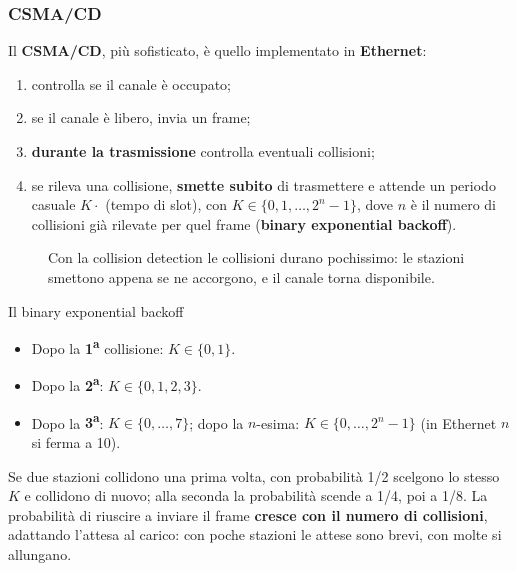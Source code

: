 \subsubsection*{CSMA/CD}

Il \textbf{CSMA/CD}, più sofisticato, è quello implementato in \textbf{Ethernet}:

\begin{enumerate}
    \item controlla se il canale è occupato;
    \item se il canale è libero, invia un frame;
    \item \textbf{durante la trasmissione} controlla eventuali collisioni;
    \item se rileva una collisione, \textbf{smette subito} di trasmettere e attende un periodo casuale $K \cdot$ (tempo di slot), con
          $K \in \{0, 1, \dots, 2^n - 1\}$, dove $n$ è il numero di collisioni già rilevate per quel frame (\textbf{binary exponential backoff}).
\end{enumerate}

\begin{figure}[H]
\centering
{}
\caption{Con la collision detection le collisioni durano pochissimo: le stazioni smettono appena se ne accorgono, e il canale torna disponibile.}
\end{figure}

\begin{esempio}{Il binary exponential backoff}
\begin{itemize}
    \item Dopo la \textbf{1\textsuperscript{a}} collisione: $K \in \{0, 1\}$.
    \item Dopo la \textbf{2\textsuperscript{a}}: $K \in \{0, 1, 2, 3\}$.
    \item Dopo la \textbf{3\textsuperscript{a}}: $K \in \{0, \dots, 7\}$; dopo la $n$-esima: $K \in \{0, \dots, 2^n - 1\}$ (in Ethernet $n$ si ferma a 10).
\end{itemize}
Se due stazioni collidono una prima volta, con probabilità 1/2 scelgono lo stesso $K$ e collidono di nuovo; alla seconda la probabilità scende
a 1/4, poi a 1/8. La probabilità di riuscire a inviare il frame \textbf{cresce con il numero di collisioni}, adattando l'attesa al carico: con
poche stazioni le attese sono brevi, con molte si allungano.
\end{esempio}

